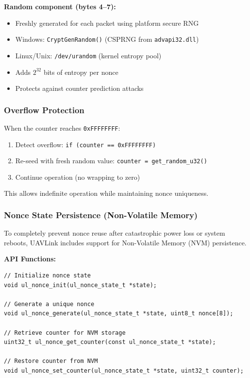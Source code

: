 \documentclass[11pt,a4paper]{article}
\begin{document}
\textbf{Random component (bytes 4--7):}
\begin{itemize}[noitemsep]
    \item Freshly generated for each packet using platform secure RNG
    \item Windows: \texttt{CryptGenRandom()} (CSPRNG from \texttt{advapi32.dll})
    \item Linux/Unix: \texttt{/dev/urandom} (kernel entropy pool)
    \item Adds $2^{32}$ bits of entropy per nonce
    \item Protects against counter prediction attacks
\end{itemize}

\subsubsection{Overflow Protection}

When the counter reaches \texttt{0xFFFFFFFF}:

\begin{enumerate}[noitemsep]
    \item Detect overflow: \texttt{if (counter == 0xFFFFFFFF)}
    \item Re-seed with fresh random value: \texttt{counter = get\_random\_u32()}
    \item Continue operation (no wrapping to zero)
\end{enumerate}

This allows indefinite operation while maintaining nonce uniqueness.

\subsubsection{Nonce State Persistence (Non-Volatile Memory)}

To completely prevent nonce reuse after catastrophic power loss or system reboots, UAVLink includes support for Non-Volatile Memory (NVM) persistence.

\textbf{API Functions:}
\begin{lstlisting}
// Initialize nonce state
void ul_nonce_init(ul_nonce_state_t *state);

// Generate a unique nonce
void ul_nonce_generate(ul_nonce_state_t *state, uint8_t nonce[8]);

// Retrieve counter for NVM storage
uint32_t ul_nonce_get_counter(const ul_nonce_state_t *state);

// Restore counter from NVM
void ul_nonce_set_counter(ul_nonce_state_t *state, uint32_t counter);
\end{lstlisting}
\end{document}
